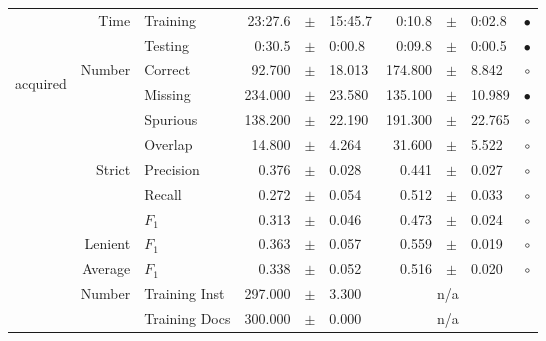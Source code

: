 \begin{longtable}{|r|r|l||rcl|rcl|c|}
\cline{2-10} & \multirow{2}{*}{      Time} &        Training &     23:27.6 &  $\pm$  &     15:45.7 &      0:10.8 &  $\pm$  &      0:02.8 & $\bullet$ \\
\cline{3-10} &                             &         Testing &      0:30.5 &  $\pm$  &      0:00.8 &      0:09.8 &  $\pm$  &      0:00.5 & $\bullet$ \\
\hline
\hline
\multirow{11}{*}{\begin{sideways}acquired\end{sideways} }
             & \multirow{4}{*}{    Number} &         Correct &      92.700 &  $\pm$  &      18.013 &     174.800 &  $\pm$  &       8.842 & $\circ$ \\
\cline{3-10} &                             &         Missing &     234.000 &  $\pm$  &      23.580 &     135.100 &  $\pm$  &      10.989 & $\bullet$ \\
\cline{3-10} &                             &        Spurious &     138.200 &  $\pm$  &      22.190 &     191.300 &  $\pm$  &      22.765 & $\circ$ \\
\cline{3-10} &                             &         Overlap &      14.800 &  $\pm$  &       4.264 &      31.600 &  $\pm$  &       5.522 & $\circ$ \\
\cline{2-10} & \multirow{3}{*}{    Strict} &       Precision &       0.376 &  $\pm$  &       0.028 &       0.441 &  $\pm$  &       0.027 & $\circ$ \\
\cline{3-10} &                             &          Recall &       0.272 &  $\pm$  &       0.054 &       0.512 &  $\pm$  &       0.033 & $\circ$ \\
\cline{3-10} &                             &           $F_1$ &       0.313 &  $\pm$  &       0.046 &       0.473 &  $\pm$  &       0.024 & $\circ$ \\
\cline{2-10} &                     Lenient &           $F_1$ &       0.363 &  $\pm$  &       0.057 &       0.559 &  $\pm$  &       0.019 & $\circ$ \\
\cline{2-10} &                     Average &           $F_1$ &       0.338 &  $\pm$  &       0.052 &       0.516 &  $\pm$  &       0.020 & $\circ$ \\
\cline{2-10} & \multirow{2}{*}{    Number} &   Training Inst &     297.000 &  $\pm$  &       3.300 &    \multicolumn{3}{c|}{n/a}         &  \\
\cline{3-10} &                             &   Training Docs &     300.000 &  $\pm$  &       0.000 &    \multicolumn{3}{c|}{n/a}         &  \\

\end{longtable}
